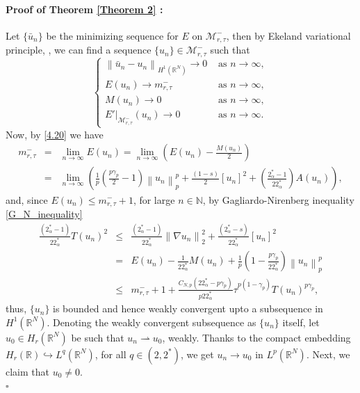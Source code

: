 \documentclass[11pt]{article}
\numberwithin{equation}{section}
\numberwithin{mytheorem}{section}
\newenvironment{myproof}[2] {\paragraph{Proof of {#1} {#2} :}}{\hfill$\square$}
\begin{document}
				\begin{myproof}{Theorem}{\ref{Theorem 2}}
					Let $\{\bar{u}_n\}$ be the minimizing sequence for $E$ on $\mathcal{M}_{r,\tau}^-$, then by Ekeland variational principle, \cite[Theorem~1.1]{Ghoussoub}, we can find a sequence $\{u_n\}\in \mathcal{M}_{r,\tau}^-$ such that
					\begin{equation}\label{4.20}
						\left\{
						\begin{array}{cl}
							\left\| \bar{u}_n-u_n\right\|_{H^1(\mathbb{R}^N)}\rightarrow 0 & \text{ as } n\rightarrow\infty,\\
							E(u_n) \rightarrow m_{r,\tau}^- & \text{ as } n\rightarrow \infty,\\
							M(u_n)\rightarrow 0 & \text{ as } n\rightarrow \infty,\\
							E'|_{\mathcal{M}_{r,\tau}^-}(u_n)\rightarrow 0 & \text{ as } n\rightarrow \infty.
						\end{array}
						\right.
					\end{equation}
					Now, by \eqref{4.20} we have
					\begin{eqnarray}\label{4.21}
						m_{r,\tau}^- & = & \lim_{n\rightarrow \infty}E(u_n)=\lim_{n\rightarrow \infty}\left(E(u_n)-\frac{M(u_n)}{2}\right)\nonumber\\
						& = & \lim_{n\rightarrow \infty}\left(\frac{1}{p}\left(\frac{p\gamma_p}{2}-1\right)\left\| u_n \right\|_p^p+\frac{(1-s)}{2}[u_n]^2+\left(\frac{2^*_{\alpha}-1}{22^*_{\alpha}}\right)A(u_n)\right),
					\end{eqnarray}
					and, since $E(u_n)\leq m_{r,\tau}^-+1$, for large $n\in \mathbb{N}$, by Gagliardo-Nirenberg inequality \eqref{G_N_inequality}
					\begin{eqnarray*}
						\frac{(2^*_{\alpha}-1)}{22^*_{\alpha}}T(u_n)^2 & \leq &  \frac{(2^*_{\alpha}-1)}{22^*_{\alpha}}\left\| \nabla u_n \right\|_2^2+\frac{(2^*_{\alpha}-s)}{22^*_{\alpha}}[u_n]^2\\
						& = & E(u_n)-\frac{1}{22^*_{\alpha}}M(u_n)+\frac{1}{p}\left(1-\frac{p\gamma_p}{22^*_{\alpha}}\right) \left\| u_n \right\|_p^p\\
						& \leq & m_{r,\tau}^-+1+\frac{C_{N,p}(22^*_{\alpha}-p\gamma_p)}{p22^*_{\alpha}}\tau^{p(1-\gamma_p)}T(u_n)^{p\gamma_p},
					\end{eqnarray*}
					thus, $\{u_n\}$ is bounded and hence weakly convergent upto a subsequence in $H^1(\mathbb{R}^N)$. Denoting the weakly convergent subsequence as $\{u_n\}$ itself, let $u_0\in H_r(\mathbb{R}^N)$ be such that $u_n\rightharpoonup u_0$, weakly. Thanks to the compact embedding $H_r(\mathbb{R})\hookrightarrow L^q(\mathbb{R}^N)$, for all $q\in (2,2^*)$, we get $u_n\rightarrow u_0$ in $L^p(\mathbb{R}^N)$. Next, we claim that $u_0\neq 0$.\\

\end{myproof}
\end{document}
